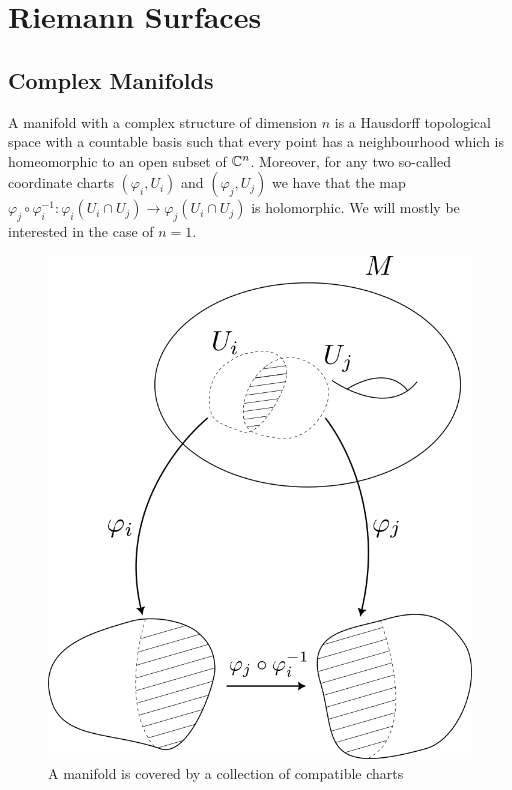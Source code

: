 \section{Riemann Surfaces}\label{sec:riem-surf}

\subsection{Complex Manifolds}
A manifold with a complex structure of dimension $n$ is a Hausdorff topological space with a countable basis such that every point has a neighbourhood which is homeomorphic to an open subset of $\mathbb{C}^n$. Moreover, for any two so-called coordinate charts $(\varphi_i, U_i)$ and $(\varphi_j, U_j)$ we have that the map $\varphi_j \circ \varphi_i^{-1}: \varphi_i(U_i \cap U_j) \to \varphi_j(U_i \cap U_j)$ is holomorphic. We will mostly be interested in the case of $n = 1$. 

\begin{figure}[ht]
    \centering
    \includegraphics[scale=0.6]{Images/manifold_def.png}
    \caption{A manifold is covered by a collection of compatible charts}
    \label{fig:manifold-def}
\end{figure}

